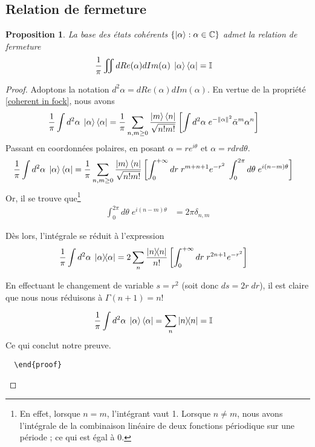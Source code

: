 \documentclass[11pt,oneside,a4paper]{article}
\newtheorem{property}[theorem]{Proposition}
\begin{document}
\subsection{Relation de fermeture}
\label{section relation de fermeture}
\begin{property}
  La base des états cohérents $\left\{\ket{\alpha} : \alpha\in\mathbb{C}\right\}$ admet la relation de fermeture
  \begin{align}
    \frac{1}{\pi}\iint dRe(\alpha)dIm(\alpha) \; \ket{\alpha}\bra{\alpha} &= \mathbb{I}
  \end{align}
\end{property}
\begin{proof}
  Adoptons la notation $d^2\alpha = dRe(\alpha)dIm(\alpha)$. En vertue de la propriété \ref{coherent in fock}, nous avons
  \begin{align}
    \frac{1}{\pi}\int d^2\alpha \; \ket{\alpha}\bra{\alpha} &= \frac{1}{\pi}\sum_{n,m\geq 0} \frac{\ket{m}\bra{n}}{\sqrt{n!m!}} \left[\int d^2\alpha \; e^{-\norm{\alpha}^{2}} \bar{\alpha}^m\alpha^n\right]
  \end{align}
  Passant en coordonnées polaires, en posant $\alpha=re^{i\theta}$ et $\alpha = rdrd\theta$.
  \begin{align}
    \frac{1}{\pi}\int d^2\alpha \; \ket{\alpha}\bra{\alpha} &= \frac{1}{\pi}\sum_{n,m\geq 0}\frac{\ket{m}\bra{n}}{\sqrt{n!m!}}\left[\int_0^{+\infty}dr\; r^{m+n+1}e^{-r^2} \; \int_0^{2\pi}d\theta \; e^{i\left(n-m\right)\theta}\right]
  \end{align}
  Or, il se trouve que\footnote{En effet, lorsque $n=m$, l'intégrant vaut 1. Lorsque $n\neq m$, nous avons l'intégrale de la combinaison linéaire de deux fonctions périodique sur une période ; ce qui est égal à 0.}
  \begin{align}
    \int_0^{2\pi}d\theta \; e^{i\left(n-m\right)\theta} &= 2\pi\delta_{n,m}
  \end{align}

Dès lors, l'intégrale se réduit à l'expression
\begin{align}
  \frac{1}{\pi}\int d^2\alpha \; \ketbra{\alpha} &= 2\sum_n \frac{\ketbra{n}}{n!}\left[\int_0^{+\infty}dr \; r^{2n+1}e^{-r^2} \right]
\end{align}

En effectuant le changement de variable $s = r^2$ (soit donc $ds = 2r \; dr$), il est claire que nous nous réduisons à $\Gamma(n+1) = n!$

\begin{align}
  \frac{1}{\pi}\int d^2\alpha \; \ket{\alpha}\bra{\alpha} &= \sum_n \ketbra{n} = \mathbb{I}
\end{align}
Ce qui conclut notre preuve.
\begin{verbatim}
  \end{proof}
\end{verbatim}
\end{proof}
\end{document}
